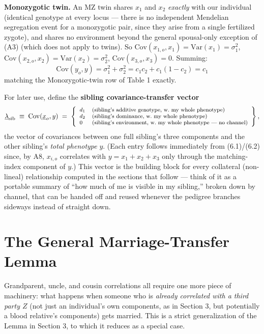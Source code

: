 \documentclass[12pt]{article}
\begin{document}
\textbf{Monozygotic twin.} An MZ twin shares $x_1$ and $x_2$ \emph{exactly} with our individual (identical genotype at every locus — there is no independent Mendelian segregation event for a monozygotic pair, since they arise from a single fertilized zygote), and shares no environment beyond the general spousal-only exception of (A3) (which does not apply to twins). So $\mathrm{Cov}(x_{1,o},x_1)=\mathrm{Var}(x_1)=\sigma_1^2$, $\mathrm{Cov}(x_{2,o},x_2)=\mathrm{Var}(x_2)=\sigma_2^2$, $\mathrm{Cov}(x_{3,o},x_3)=0$. Summing:
\begin{equation}
\boxed{\mathrm{Cov}(y_o,y) = \sigma_1^2+\sigma_2^2 = c_1c_2 + c_1(1-c_2) = c_1}
\end{equation}
matching the Monozygotic-twin row of Table 1 exactly.

For later use, define the \textbf{sibling covariance-transfer vector}
\begin{equation*}
\footnotesize
\underline\lambda_{\mathrm{sib}} \;\equiv\; \mathrm{Cov}(\underline x_o,y) \;=\;
\left\{\begin{array}{ll}
d_1 & \text{(sibling's additive genotype, w.\ my whole phenotype)} \\
d_2 & \text{(sibling's dominance, w.\ my whole phenotype)} \\
0 & \text{(sibling's environment, w.\ my whole phenotype --- no channel)}
\end{array}\right\} ,
\end{equation*}
the vector of covariances between one full sibling's three components and the other sibling's \emph{total phenotype} $y$. (Each entry follows immediately from (6.1)/(6.2) since, by A8, $x_{i,o}$ correlates with $y=x_1+x_2+x_3$ only through the matching-index component of $y$.) This vector is the building block for every collateral (non-lineal) relationship computed in the sections that follow — think of it as a portable summary of ``how much of me is visible in my sibling,'' broken down by channel, that can be handed off and reused whenever the pedigree branches sideways instead of straight down.

\section{The General Marriage-Transfer Lemma}

Grandparent, uncle, and cousin correlations all require one more piece of machinery: what happens when someone who is \emph{already correlated with a third party $Z$} (not just an individual's own components, as in Section 3, but potentially a blood relative's components) gets married. This is a strict generalization of the Lemma in Section 3, to which it reduces as a special case.
\end{document}
